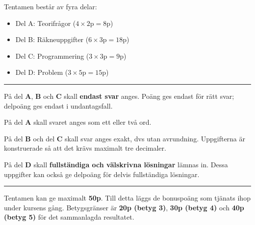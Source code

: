 Tentamen består av fyra delar:
\begin{itemize}
\item
  Del A: Teorifrågor ($4 \times 2\mathrm{p} = 8\mathrm{p}$)  
\item
  Del B: Räkneuppgifter ($6 \times 3\mathrm{p} = 18\mathrm{p}$)
\item
  Del C: Programmering ($3 \times 3\mathrm{p} = 9\mathrm{p}$)
\item
  Del D: Problem ($3 \times 5\mathrm{p} = 15\mathrm{p}$)
\end{itemize}

\bigskip
\hrule
\bigskip

På del \textbf{A}, \textbf{B} och \textbf{C} skall \textbf{endast svar} anges.
Poäng ges endast för rätt svar; delpoäng ges endast i undantagsfall. 

På del \textbf{A} skall svaret anges som ett eller två ord.

På del \textbf{B} och del \textbf{C} skall svar anges exakt, dvs utan
avrundning. Uppgifterna är konstruerade så att det krävs maximalt tre decimaler.

På del \textbf{D} skall \textbf{fullständiga och välskrivna lösningar} lämnas
in. Dessa uppgifter kan också ge delpoäng för delvis fullständiga lösningar.

\bigskip
\hrule
\bigskip

Tentamen kan ge maximalt \textbf{50p}. Till detta läggs de bonuspoäng som
tjänats ihop under kursens gång. Betygsgränser är \textbf{20p (betyg 3)},
\textbf{30p (betyg 4)} och \textbf{40p (betyg 5)} för det sammanlagda
resultatet.

\bigskip
